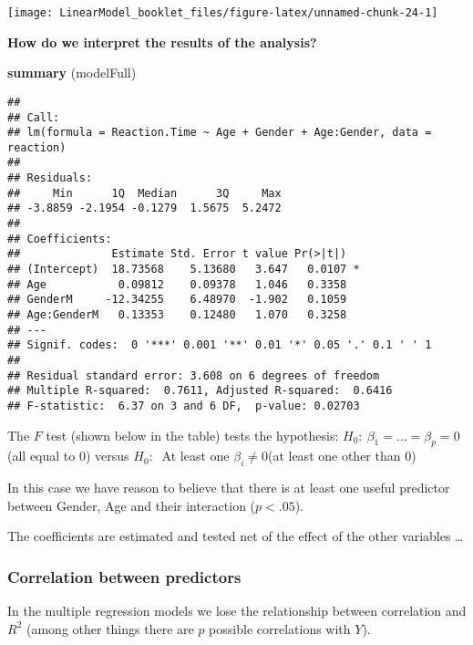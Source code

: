 \documentclass[
]{article}
\newenvironment{Shaded}{\begin{snugshade}}{\end{snugshade}}
\newcommand{\KeywordTok}[1]{\textcolor[rgb]{0.13,0.29,0.53}{\textbf{#1}}}
\newcommand{\NormalTok}[1]{#1}
\begin{document}
\begin{center}\texttt{[image: LinearModel\_booklet\_files/figure-latex/unnamed-chunk-24-1]} \end{center}

\textbf{How do we interpret the results of the analysis?}

\begin{Shaded}
\begin{Highlighting}[]
\KeywordTok{summary}\NormalTok{ (modelFull)}
\end{Highlighting}
\end{Shaded}

\begin{verbatim}
## 
## Call:
## lm(formula = Reaction.Time ~ Age + Gender + Age:Gender, data = reaction)
## 
## Residuals:
##     Min      1Q  Median      3Q     Max 
## -3.8859 -2.1954 -0.1279  1.5675  5.2472 
## 
## Coefficients:
##              Estimate Std. Error t value Pr(>|t|)  
## (Intercept)  18.73568    5.13680   3.647   0.0107 *
## Age           0.09812    0.09378   1.046   0.3358  
## GenderM     -12.34255    6.48970  -1.902   0.1059  
## Age:GenderM   0.13353    0.12480   1.070   0.3258  
## ---
## Signif. codes:  0 '***' 0.001 '**' 0.01 '*' 0.05 '.' 0.1 ' ' 1
## 
## Residual standard error: 3.608 on 6 degrees of freedom
## Multiple R-squared:  0.7611, Adjusted R-squared:  0.6416 
## F-statistic:  6.37 on 3 and 6 DF,  p-value: 0.02703
\end{verbatim}

The \(F\) test (shown below in the table) tests the hypothesis:
\(H_0: \ \beta_1 = \ldots = \beta_p = 0\) (all equal to 0) versus
\(H_0: \ \) At least one \(\beta_i \neq 0\)(at least one other than 0)

In this case we have reason to believe that there is at least one useful
predictor between Gender, Age and their interaction (\(p <.05\)).

The coefficients are estimated and tested net of the effect of the other
variables \ldots{}

\hypertarget{correlation-between-predictors}{%
\subsubsection{Correlation between
predictors}\label{correlation-between-predictors}}

In the multiple regression models we lose the relationship between
correlation and\(R^2\) (among other things there are \(p\) possible
correlations with \(Y\)).
\end{document}
